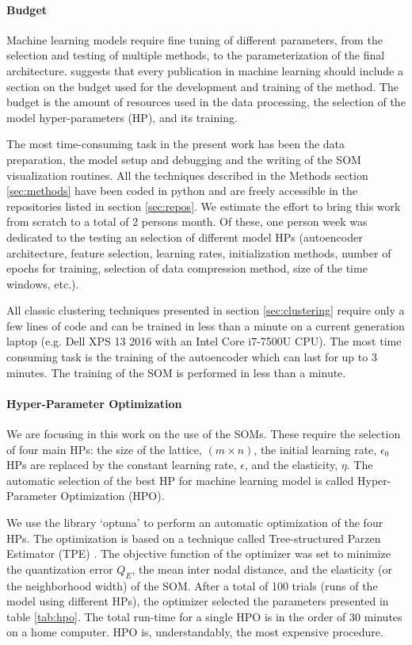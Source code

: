 \paragraph{Budget}
Machine learning models require fine tuning of different parameters, from the selection and testing of multiple methods, to the parameterization of the final architecture. \citep{[REF??]} suggests that every publication in machine learning should include a section on the budget used for the development and training of the method. The budget is the amount of resources used in the data processing, the selection of the model hyper-parameters (HP), and its training.

The most time-consuming task in the present work has been the data preparation, the model setup and debugging and the writing of the SOM visualization routines. All the techniques described in the Methods section \ref{sec:methods} have been coded in python and are freely accessible in the repositories listed in section \ref{sec:repos}. We estimate the effort to bring this work from scratch to a total of 2 persons month. Of these, one person week was dedicated to the testing an selection of different model HPs (autoencoder architecture, feature selection, learning rates, initialization methods, number of epochs for training, selection of data compression method, size of the time windows, etc.).

All classic clustering techniques presented in section \ref{sec:clustering} require only a few lines of code and can be trained in less than a minute on a current generation laptop (e.g. Dell XPS 13 2016 with an Intel Core i7-7500U CPU). The most time consuming task is the training of the autoencoder which can last for up to 3 minutes. The training of the SOM is performed in less than a minute.

\paragraph{Hyper-Parameter Optimization}
We are focusing in this work on the use of the SOMs. These require the selection of four main HPs: the size of the lattice, $(m\times n)$, the initial learning rate, $\epsilon_0$HPs are replaced by the constant learning rate, $\epsilon$, and the elasticity, $\eta$. The automatic selection of the best HP for machine learning model is called Hyper-Parameter Optimization (HPO).

We use the library `optuna' \citep{[REF??]} to perform an automatic optimization of the four HPs. The optimization is based on a technique called Tree-structured Parzen Estimator (TPE) \citep{[REF 3 IN OPTUNA PAPER??]}. The objective function of the optimizer was set to minimize the quantization error $Q_E$, the mean inter nodal distance, and the elasticity (or the neighborhood width) of the SOM. After a total of 100 trials (runs of the model using different HPs), the optimizer selected the parameters presented in table \ref{tab:hpo}. The total run-time for a single HPO is in the order of 30 minutes on a home computer. HPO is, understandably, the most expensive procedure.